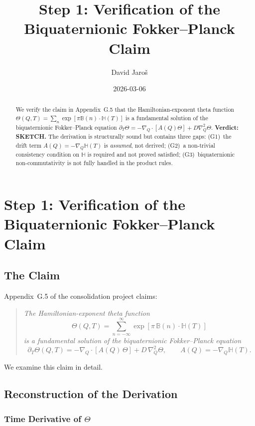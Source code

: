 \documentclass[12pt]{article}
\title{\textbf{Step 1: Verification of the Biquaternionic Fokker--Planck Claim}}
\author{David Jaroš}
\date{2026-03-06}
\theoremstyle{definition}
\theoremstyle{remark}
\begin{document}
  \maketitle

  \begin{abstract}
  We verify the claim in Appendix~G.5 that the Hamiltonian-exponent theta function
  $\Theta(Q,T) = \sum_n \exp[\pi \mathbb{B}(n)\cdot\mathbb{H}(T)]$ is a fundamental
  solution of the biquaternionic Fokker--Planck equation
  $\partial_T \Theta = -\nabla_Q \cdot [A(Q)\Theta] + D\nabla_Q^2\Theta$.
  \textbf{Verdict: SKETCH.}
  The derivation is structurally sound but contains three gaps:
  (G1)~the drift term $A(Q) = -\nabla_Q \mathbb{H}(T)$ is \emph{assumed}, not derived;
  (G2)~a non-trivial consistency condition on $\mathbb{H}$ is required and not proved satisfied;
  (G3)~biquaternionic non-commutativity is not fully handled in the product rules.
  \end{abstract}
\fi

\section{Step 1: Verification of the Biquaternionic Fokker--Planck Claim}
\label{sec:fpe_verification}

\subsection{The Claim}

Appendix~G.5 of the consolidation project claims:

\begin{quotation}
\textit{The Hamiltonian-exponent theta function
\[
  \Theta(Q,T) = \sum_{n=-\infty}^{\infty} \exp\!\left[\pi\,\mathbb{B}(n) \cdot \mathbb{H}(T)\right]
\]
is a fundamental solution of the biquaternionic Fokker--Planck equation
\[
  \partial_T \Theta(Q,T) = -\nabla_Q \cdot \left[A(Q)\,\Theta\right] + D\,\nabla_Q^2\Theta,
  \qquad A(Q) = -\nabla_Q \mathbb{H}(T).
\]}
\end{quotation}

\noindent
We examine this claim in detail.

\subsection{Reconstruction of the Derivation}

\subsubsection{Time Derivative of $\Theta$}
\end{document}
